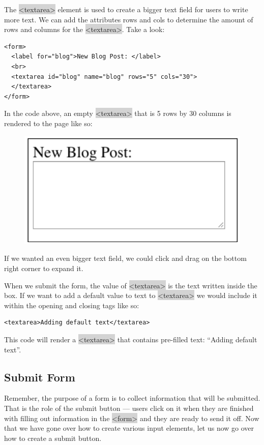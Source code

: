 \documentclass[11pt]{article}
\begin{document}
The \colorbox{lightgray}{<textarea>} element is used to create a bigger text field for users to write more text. We can add the attributes rows and cols to determine the amount of rows and columns for the \colorbox{lightgray}{<textarea>}. Take a look:
\begin{lstlisting}
<form>
  <label for="blog">New Blog Post: </label>
  <br>
  <textarea id="blog" name="blog" rows="5" cols="30">
  </textarea>
</form>
\end{lstlisting}
In the code above, an empty \colorbox{lightgray}{<textarea>} that is 5 rows by 30 columns is rendered to the page like so:
\begin{figure}[H]
\includegraphics[scale = 0.5]{3_15}
\centering
\end{figure}
\vspace{-4mm}
If we wanted an even bigger text field, we could click and drag on the bottom right corner to expand it.

When we submit the form, the value of \colorbox{lightgray}{<textarea>} is the text written inside the box. If we want to add a default value to text to \colorbox{lightgray}{<textarea>} we would include it within the opening and closing tags like so:
\begin{lstlisting}
<textarea>Adding default text</textarea>
\end{lstlisting}
This code will render a \colorbox{lightgray}{<textarea>} that contains pre-filled text: “Adding default text”.

\subsection{Submit Form}
Remember, the purpose of a form is to collect information that will be submitted. That is the role of the submit button — users click on it when they are finished with filling out information in the \colorbox{lightgray}{<form>} and they are ready to send it off. Now that we have gone over how to create various input elements, let us now go over how to create a submit button.
\end{document}
